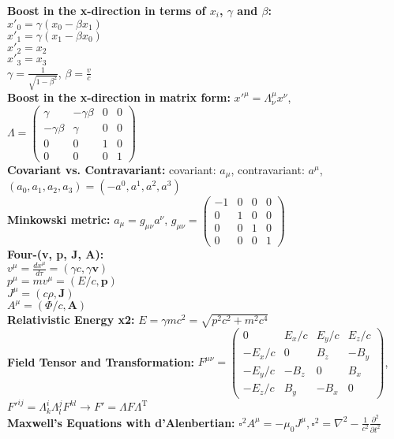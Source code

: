 \documentclass[12pt]{extarticle}
\newcommand{\A}{\mathbf{A}}
\newcommand{\J}{\mathbf{J}}
\begin{document}
\textbf{Boost in the x-direction in terms of $x_i$, $\gamma$ and $\beta$:} \\
$x'_0 = \gamma(x_0-\beta x_1)$ \\
$x'_1 = \gamma(x_1-\beta x_0)$ \\
$x'_2 = x_2$ \\
$x'_3 = x_3$ \\
$\gamma = \frac{1}{\sqrt{1-\beta^2}}$, $\beta = \frac{v}{c}$ \\
\textbf{Boost in the x-direction in matrix form:} $x'^\mu = \Lambda^\mu_\nu x^\nu$, $\Lambda = \begin{pmatrix} \gamma&-\gamma\beta&0&0 \\ -\gamma\beta&\gamma&0&0 \\ 0&0&1&0 \\ 0&0&0&1 \end{pmatrix}$ \\
\textbf{Covariant vs. Contravariant:} covariant: $a_\mu$, contravariant: $a^\mu$, $(a_0,a_1,a_2,a_3) = (-a^0,a^1,a^2,a^3)$ \\
\textbf{Minkowski metric:} $a_\mu = g_{\mu\nu} a^\nu$, $g_{\mu\nu} = \begin{pmatrix} -1&0&0&0 \\ 0&1&0&0 \\ 0&0&1&0 \\ 0&0&0&1 \end{pmatrix}$ \\
\textbf{Four-(v, p, J, A):} \\
$v^\mu=\frac{dx^\mu}{d\tau}=(\gamma c, \gamma \mathbf{v})$ \\
$p^\mu=mv^\mu=(E/c,\mathbf{p})$ \\
$J^\mu=(c\rho,\J)$ \\
$A^\mu=(\Phi/c,\A)$ \\
\textbf{Relativistic Energy x2:} $E=\gamma mc^2=\sqrt{p^2c^2+m^2c^4}$ \\
\textbf{Field Tensor and Transformation:} $F^{\mu\nu} = \begin{pmatrix} 0&E_x/c&E_y/c&E_z/c \\-E_x/c&0&B_z&-B_y \\ -E_y/c&-B_z&0&B_x \\ -E_z/c&B_y&-B_x&0 \end{pmatrix}$, $F'^{ij} = \Lambda^i_k\Lambda^j_l F^{kl} \rightarrow F'=\Lambda F \Lambda^\mathrm{T}$ \\
\textbf{Maxwell's Equations with d'Alenbertian:} $\square^2A^\mu = -\mu_0J^\mu, \square^2 = \nabla^2-\frac{1}{c^2}\frac{\partial^2}{\partial t^2}$ \\
\end{document}

